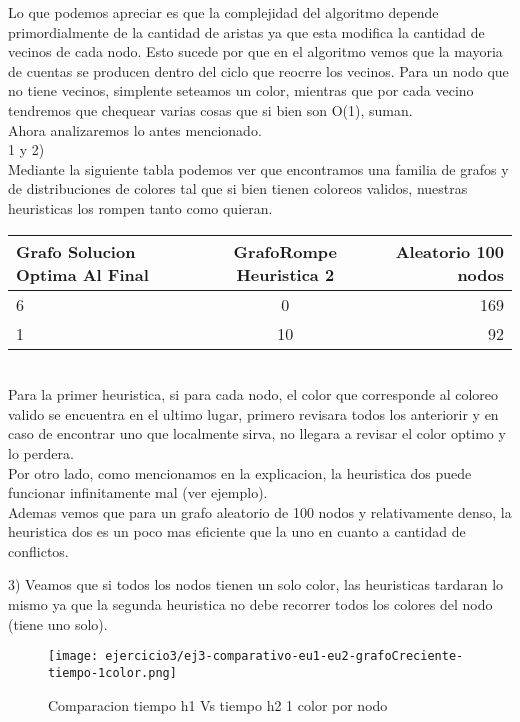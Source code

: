 \begin{enumerate}
Lo que podemos apreciar es que la complejidad del algoritmo depende primordialmente de la cantidad de aristas ya que esta modifica la cantidad de vecinos de cada nodo. Esto sucede por que en el algoritmo vemos que la mayoria de cuentas se producen dentro del ciclo que reocrre los vecinos. Para un nodo que no tiene vecinos, simplente seteamos un color, mientras que por cada vecino tendremos que chequear varias cosas que si bien son O(1), suman.\\
Ahora analizaremos lo antes mencionado. \\
1 y 2)\\ Mediante la siguiente tabla podemos ver que encontramos una familia de grafos y de distribuciones de colores tal que si bien tienen coloreos validos, nuestras heuristicas los rompen tanto como quieran.\\
\begin{tabular}{| l | c | r |}
  \hline
Grafo Solucion Optima Al Final  & GrafoRompe Heuristica 2 & Aleatorio 100 nodos \\ \hline
6  & 0 & 169\\ \hline
1  & 10 & 92\\ \hline
\end{tabular}

\\Para la primer heuristica, si para cada nodo, el color que corresponde al coloreo valido se encuentra en el ultimo lugar, primero revisara todos los anteriorir y en caso de encontrar uno que localmente sirva, no llegara a revisar el color optimo y lo perdera.\\
Por otro lado, como mencionamos en la explicacion, la heuristica dos puede funcionar infinitamente mal (ver ejemplo).\\
Ademas vemos que para un grafo aleatorio de 100 nodos y relativamente denso, la heuristica dos es un poco mas eficiente que la uno en cuanto a cantidad de conflictos.

3) Veamos que si todos los nodos tienen un solo color, las heuristicas tardaran lo mismo ya que la segunda heuristica no debe recorrer todos los colores del nodo (tiene uno solo).\\

\begin{figure}[h!]
\texttt{[image: ejercicio3/ej3-comparativo-eu1-eu2-grafoCreciente-tiempo-1color.png]}
\centering
\caption{Comparacion tiempo h1 Vs tiempo h2 1 color por nodo}
\label{overflow3}
\end{figure}



\end{enumerate}

